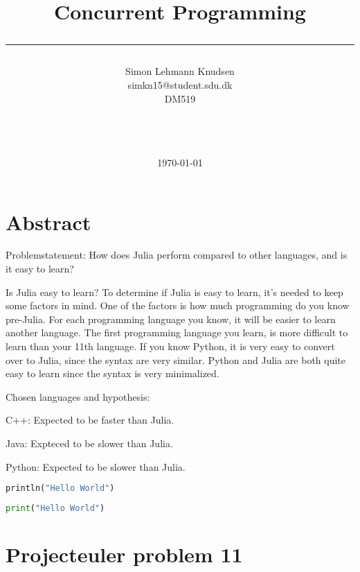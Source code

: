 \documentclass[a4paper,11pt]{article}
\title{Concurrent Programming\\\rule{10cm}{0.5mm}}
\author{Simon Lehmann Knudsen
\\simkn15@student.sdu.dk\\ DM519\\\rule{5.5cm}{0.5mm}\\}
\date{\today}
\begin{document}
\maketitle

\vfill

\newpage
\section{Abstract}
Problemstatement:
How does Julia perform compared to other languages, and is it easy to learn?

Is Julia easy to learn?
To determine if Julia is easy to learn, it's needed to keep some factors in mind. One of the factors is how much programming do you know pre-Julia. For each programming language you know, it will be easier to learn another language. The first programming language you learn, is more difficult to learn than your 11th language. If you know Python, it is very easy to convert over to Julia, since the syntax are very similar. Python and Julia are both quite easy to learn since the syntax is very minimalized.

Chosen languages and hypothesis:
\begin{list}{}{}
	\item C++: Expected to be faster than Julia.
	\item Java: Expteced to be slower than Julia.
	\item Python: Expected to be slower than Julia.
\end{list}

\begin{lstlisting}[caption=Hello World in Julia, language=python]
println("Hello World")
\end{lstlisting}

\begin{lstlisting}[caption=Hello World in Python, language=python]
print("Hello World")
\end{lstlisting}

\section{Projecteuler problem 11}
\end{document}
